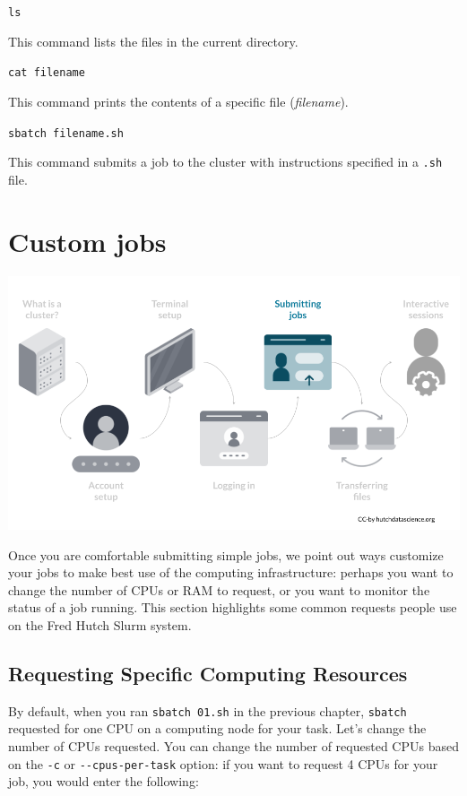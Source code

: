 \documentclass[
]{book}
\begin{document}
\texttt{ls}

This command lists the files in the current directory.

\texttt{cat\ filename}

This command prints the contents of a specific file (\emph{filename}).

\texttt{sbatch\ filename.sh}

This command submits a job to the cluster with instructions specified in a \texttt{.sh} file.

\hypertarget{custom-jobs}{%
\chapter{Custom jobs}\label{custom-jobs}}

\begin{center}\includegraphics[width=0.8\linewidth]{resources/images/07-custom-jobs_files/figure-latex//1BQxrVYdKZTbpCaF-i_q9w7s9x034lEXpQZDU-Sl09cs_gff2211b72f_1_229} \end{center}

Once you are comfortable submitting simple jobs, we point out ways customize your jobs to make best use of the computing infrastructure: perhaps you want to change the number of CPUs or RAM to request, or you want to monitor the status of a job running. This section highlights some common requests people use on the Fred Hutch Slurm system.

\hypertarget{requesting-specific-computing-resources}{%
\section{Requesting Specific Computing Resources}\label{requesting-specific-computing-resources}}

By default, when you ran \texttt{sbatch\ 01.sh} in the previous chapter, \texttt{sbatch} requested for one CPU on a computing node for your task. Let's change the number of CPUs requested. You can change the number of requested CPUs based on the \texttt{-c} or \texttt{-\/-cpus-per-task} option: if you want to request 4 CPUs for your job, you would enter the following:
\end{document}
